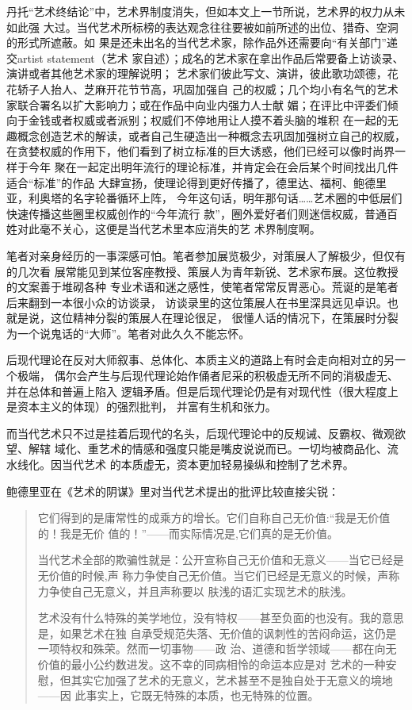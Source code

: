 丹托“艺术终结论”中，艺术界制度消失，但如本文上一节所说，艺术界的权力从未如此强
大过。当代艺术所标榜的表达观念往往要被如前所述的出位、猎奇、空洞的形式所遮蔽。如
果是还未出名的当代艺术家，除作品外还需要向“有关部门”递交artist statement（艺术
家自述）；成名的艺术家在拿出作品后常要备上访谈录、演讲或者其他艺术家的理解说明；
艺术家们彼此写文、演讲，彼此歌功颂德，花花轿子人抬人、芝麻开花节节高，巩固加强自
己的权威；几个均小有名气的艺术家联合署名以扩大影响力；或在作品中向业内强力人士献
媚；在评比中评委们倾向于金钱或者权威或者派别；权威们不停地用让人摸不着头脑的堆积
在一起的无趣概念创造艺术的解读，或者自己生硬造出一种概念去巩固加强树立自己的权威，
在贪婪权威的作用下，他们看到了树立标准的巨大诱惑，他们已经可以像时尚界一样于今年
聚在一起定出明年流行的理论标准，并肯定会在会后某个时间找出几件适合“标准”的作品
大肆宣扬，使理论得到更好传播了，德里达、福柯、鲍德里亚，利奥塔的名字轮番循环上阵，
今年这句话，明年那句话……艺术圈的中低层们快速传播这些圈里权威创作的“今年流行
款”，圈外爱好者们则迷信权威，普通百姓对此毫不关心，这便是当代艺术里本应消失的艺
术界制度啊。

笔者对亲身经历的一事深感可怕。笔者参加展览极少，对策展人了解极少，但仅有的几次看
展常能见到某位客座教授、策展人为青年新锐、艺术家布展。这位教授的文案善于堆砌各种
专业术语和迷之感性，使笔者常常反胃恶心。荒诞的是笔者后来翻到一本很小众的访谈录，
访谈录里的这位策展人在书里深具远见卓识。也就是说，这位精神分裂的策展人在理论很足，
很懂人话的情况下，在策展时分裂为一个说鬼话的“大师”。笔者对此久久不能忘怀。

后现代理论在反对大师叙事、总体化、本质主义的道路上有时会走向相对立的另一个极端，
偶尔会产生与后现代理论始作俑者尼采的积极虚无所不同的消极虚无、并在总体和普遍上陷入
逻辑矛盾。但是后现代理论仍是有对现代性（很大程度上是资本主义的体现）的强烈批判，
并富有生机和张力。

而当代艺术只不过是挂着后现代的名头，后现代理论中的反规诫、反霸权、微观欲望、解辖
域化、重艺术的情感和强度只能是嘴皮说说而已。一切均被商品化、流水线化。因当代艺术
的本质虚无，资本更加轻易操纵和控制了艺术界。

鲍德里亚在《艺术的阴谋》里对当代艺术提出的批评比较直接尖锐：
\begin{quotation}
它们得到的是庸常性的成乘方的增长。它们自称自己无价值:“我是无价值的！我是无价
值的！”——而实际情况是,它们真的是无价值。

当代艺术全部的欺骗性就是：公开宣称自己无价值和无意义——当它已经是无价值的时候,声
称力争使自己无价值。当它们已经是无意义的时候，声称力争使自己无意义，并且声称要以
肤浅的语汇实现艺术的肤浅。\cite{artistyinmou}

艺术没有什么特殊的美学地位，没有特权——甚至负面的也没有。我的意思是，如果艺术在独
自承受规范失落、无价值的讽刺性的苦闷命运，这仍是一项特权和殊荣。然而一切事物——政
治、道德和哲学领域——都在向无价值的最小公约数进发。这不幸的同病相怜的命运本应是对
艺术的一种安慰，但其实它加强了艺术的无意义，艺术甚至不是独自处于无意义的境地——因
此事实上，它既无特殊的本质，也无特殊的位置。\cite{yishudexiaoshi}

\end{quotation}


